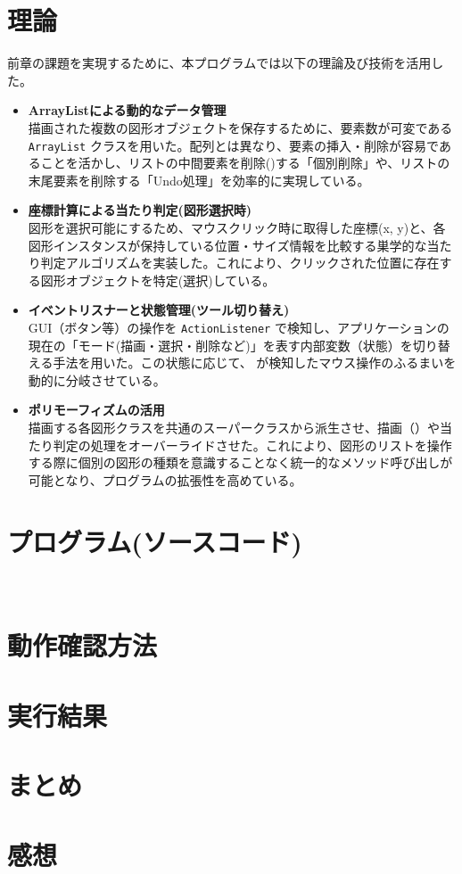 \documentclass[11pt,a4paper]{ltjsarticle}
\begin{document}
\section{理論}
前章の課題を実現するために、本プログラムでは以下の理論及び技術を活用した。
\begin{itemize}
    \item \textbf{ArrayListによる動的なデータ管理}\\
        描画された複数の図形オブジェクトを保存するために、要素数が可変である \texttt{ArrayList} クラスを用いた。配列とは異なり、要素の挿入・削除が容易であることを活かし、リストの中間要素を削除()する「個別削除」や、リストの末尾要素を削除する「Undo処理」を効率的に実現している。

    \item \textbf{座標計算による当たり判定(図形選択時)} \\
        図形を選択可能にするため、マウスクリック時に取得した座標(x, y)と、各図形インスタンスが保持している位置・サイズ情報を比較する巣学的な当たり判定アルゴリズムを実装した。これにより、クリックされた位置に存在する図形オブジェクトを特定(選択)している。

    \item \textbf{イベントリスナーと状態管理(ツール切り替え)} \\
        GUI（ボタン等）の操作を \texttt{ActionListener} で検知し、アプリケーションの現在の「モード(描画・選択・削除など)」を表す内部変数（状態）を切り替える手法を用いた。この状態に応じて、  が検知したマウス操作のふるまいを動的に分岐させている。

    \item \textbf{ポリモーフィズムの活用} \\
        描画する各図形クラスを共通のスーパークラスから派生させ、描画（）や当たり判定の処理をオーバーライドさせた。これにより、図形のリストを操作する際に個別の図形の種類を意識することなく統一的なメソッド呼び出しが可能となり、プログラムの拡張性を高めている。
\end{itemize}
\section{プログラム(ソースコード)} \\


\section{動作確認方法}

\section{実行結果}

\section{まとめ}

\section{感想}
\end{document}
